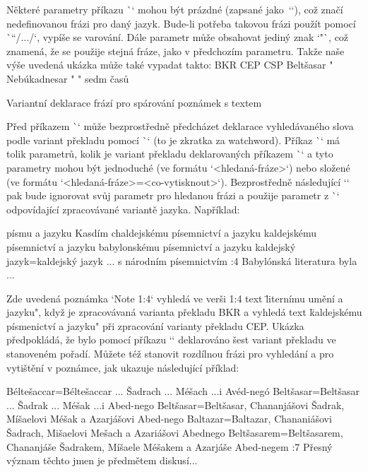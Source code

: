 Některé parametry příkazu \`\vdef` mohou být prázdné (zapsané jako~`{}`),
což značí nedefinovanou frázi pro daný jazyk.
Bude-li potřeba takovou frázi použít pomocí \`\x``/.../`, vypíše se varování.
Dále parametr může obsahovat jediný znak `"`, což znamená, že se
použije stejná fráze, jako v předchozím parametru. Takže naše
výše uvedená ukázka může také vypadat takto:
\begtt
{} {BKR}            {CEP}          {CSP}
       {Beltšasar}    {"}
 {Nebúkadnesar} {"}
       {"}            {sedm časů}
\endtt


\secc[ww] Variantní deklarace frází pro spárování poznámek s textem

Před příkazem \`\Note` může bezprostředně předcházet deklarace vyhledávaného
slova podle variant překladu pomocí \`\ww` (to je zkratka za watchword).
Příkaz \`\ww` má tolik parametrů, kolik je variant překladu deklarovaných
příkazem \`\variants` a tyto parametry mohou být jednoduché (ve formátu
`{<hledaná-fráze>}`) nebo složené (ve formátu
`{<hledaná-fráze>}={<co-vytisknout>}`). Bezprostředně následující `\Note`
pak bude ignorovat svůj parametr pro hledanou frázi a použije parametr z \`\ww`
odpovídající zpracovávané variantě jazyka. Například:

\begtt
{}  %
    {písmu a jazyku Kasdím} %
    {chaldejskému písemnictví a jazyku}  %
    {kaldejskému písemnictví a jazyku} %
    {babylonskému písemnictví a jazyku}  %
    {kaldejský jazyk}={kaldejský jazyk ... s národním písemnictvím}  %
:4 {} Babylónská literatura byla ...
\endtt

Zde uvedená poznámka `Note 1:4` vyhledá ve verši 1:4 text \"liternímu umění a jazyku",
když je zpracovávaná varianta překladu BKR a vyhledá text
\"kaldejskému písmenictví a jazyku" při zpracování varianty překladu CEP.
Ukázka předpokládá, že bylo pomocí příkazu `\variants` deklarováno šest
variant překladu ve stanoveném pořadí. Můžete též stanovit rozdílnou frázi
pro vyhledání a pro vytištění v poznámce, jak ukazuje následující příklad:

\begtt
{}  %
    {Béltešaccar}={Béltešaccar ... Šadrach ... Méšach ...i Avéd-negó} %
    {Beltšasar}={Beltšasar ... Šadrak ... Méšak ...i Abed-nego}  %
    {Beltšasar}={Beltšasar, Chananjášovi Šadrak, Míšaelovi Méšak a Azarjášovi Abed-nego}
    {Baltazar}={Baltazar, Chananiášovi Šadrach, Mišaelovi Mešach a Azariášovi Abednego}
    {Beltšasarem}={Beltšasarem, Chananjáše Šadrakem, Míšaele Méšakem a Azarjáše Abed-negem}
:7  {} Přesný význam těchto jmen je předmětem diskusí...
\endtt


